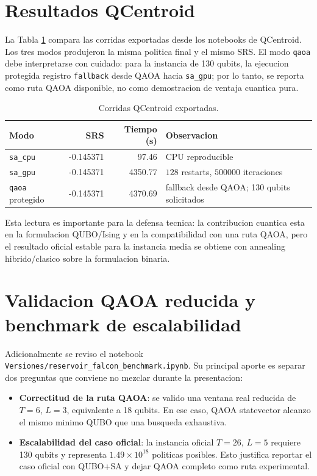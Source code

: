 \documentclass[11pt,letterpaper]{article}
\begin{document}
\section{Resultados QCentroid}

La Tabla \ref{tab:qcentroid} compara las corridas exportadas desde los
notebooks de QCentroid. Los tres modos produjeron la misma politica final y
el mismo SRS. El modo \texttt{qaoa} debe interpretarse con cuidado: para la
instancia de 130 qubits, la ejecucion protegida registro \texttt{fallback}
desde QAOA hacia \texttt{sa\_gpu}; por lo tanto, se reporta como ruta
QAOA disponible, no como demostracion de ventaja cuantica pura.

\begin{table}[H]
\centering
\caption{Corridas QCentroid exportadas.}
\label{tab:qcentroid}
\begin{tabular}{lrrl}
\toprule
Modo & SRS & Tiempo (s) & Observacion \\
\midrule
\texttt{sa\_cpu} & -0.145371 & 97.46 & CPU reproducible \\
\texttt{sa\_gpu} & -0.145371 & 4350.77 & $128$ restarts, $500000$ iteraciones \\
\texttt{qaoa} protegido & -0.145371 & 4370.69 & fallback desde QAOA; 130 qubits solicitados \\
\bottomrule
\end{tabular}
\end{table}

Esta lectura es importante para la defensa tecnica: la contribucion cuantica
esta en la formulacion QUBO/Ising y en la compatibilidad con una ruta QAOA,
pero el resultado oficial estable para la instancia media se obtiene con
annealing hibrido/clasico sobre la formulacion binaria.

\section{Validacion QAOA reducida y benchmark de escalabilidad}

Adicionalmente se reviso el notebook
\texttt{Versiones/reservoir\_falcon\_benchmark.ipynb}. Su principal aporte es
separar dos preguntas que conviene no mezclar durante la presentacion:

\begin{itemize}
  \item \textbf{Correctitud de la ruta QAOA}: se valido una ventana real reducida
  de $T=6$, $L=3$, equivalente a 18 qubits. En ese caso, QAOA statevector alcanzo
  el mismo minimo QUBO que una busqueda exhaustiva.
  \item \textbf{Escalabilidad del caso oficial}: la instancia oficial
  $T=26$, $L=5$ requiere 130 qubits y representa
  $1.49\times10^{18}$ politicas posibles. Esto justifica reportar el caso
  oficial con QUBO+SA y dejar QAOA completo como ruta experimental.
\end{itemize}
\end{document}
